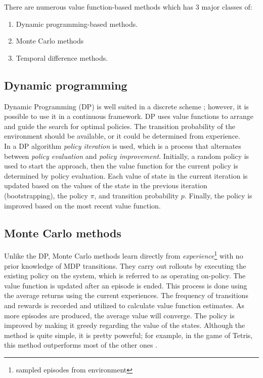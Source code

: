 There are numerous value function-based methods which has 3 major classes of:

\begin{enumerate}
	\item Dynamic programming-based methods.
	\item Monte Carlo methods
	\item Temporal difference methods.
\end{enumerate}

\subsection{Dynamic programming}

Dynamic Programming (DP) is well suited in a discrete scheme \cite{bucsoniu2010approximate}; however, it is possible to use it in a continuous framework. DP uses value functions to arrange and guide the search for optimal policies. The transition probability of the environment should be available, or it could be determined from experience.\\

In a DP algorithm \textit{policy iteration} is used, which is a process that alternates between \textit{policy evaluation} and \textit{policy improvement}. Initially, a random policy is used to start the approach, then the value function for the current policy is determined by policy evaluation. Each value of state in the current iteration is updated based on the values of the state in the previous iteration (bootstrapping), the policy $\pi$, and transition probability $p$. Finally, the policy is improved based on the most recent value function.

\subsection{Monte Carlo methods}

Unlike the DP, Monte Carlo methods learn directly from \textit{experience}\footnote{sampled episodes from environment} with no prior knowledge of MDP transitions. They carry out rollouts by executing the existing policy on the system, which is referred to as operating on-policy. The value function is updated after an episode is ended. This process is done using the average returns using the current experiences. The frequency of transitions and rewards is recorded and utilized to calculate value function estimates. As more episodes are produced, the average value will converge. The policy is improved by making it greedy regarding the value of the states. Although the method is quite simple, it is pretty powerful; for example, in the game of Tetris, this method outperforms most of the other ones \cite{gabillon2013approximate}.

